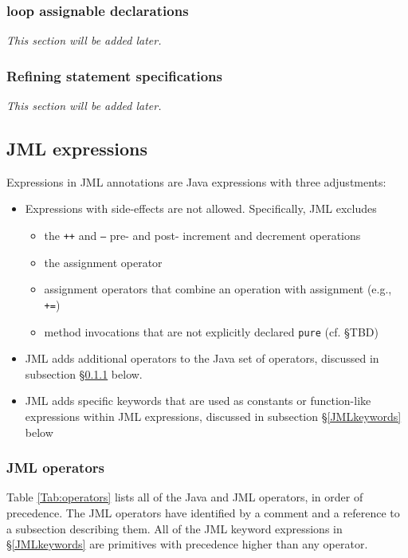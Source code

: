 \subsubsection{loop assignable declarations}
\textit{This section will be added later.} %


\subsubsection{Refining statement specifications}
\textit{This section will be added later.} %

\subsection{JML expressions}

Expressions in JML annotations are Java expressions with three adjustments:
\begin{itemize}
\item Expressions with side-effects are not allowed. Specifically, JML excludes
\begin{itemize}[noitemsep,nolistsep]
\item the \texttt{++} and \texttt{--} pre- and post- increment and decrement operations
\item the assignment operator
\item assignment operators that combine an operation with assignment (e.g., \texttt{+=})
\item method invocations that are not explicitly declared \texttt{pure} (cf. \S TBD)
\end{itemize}
\item JML adds additional operators to the Java set of operators, discussed in subsection \S\ref{JMLoperators} below.
\item JML adds specific keywords that are used as constants or function-like expressions within JML expressions, discussed in subsection \S\ref{JMLkeywords} below
\end{itemize}

\subsubsection{JML operators}
\label{JMLoperators}

Table \ref{Tab:operators} lists all of the Java and JML operators, in order of precedence. The JML operators have identified by a comment and a reference to a subsection describing them. All of the JML keyword expressions in \S\ref{JMLkeywords} are primitives with precedence higher than any operator.


